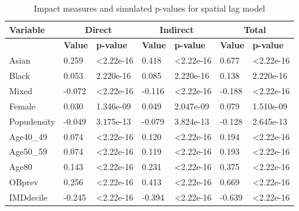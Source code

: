 \begin{table}[]
\centering
\begin{tabular}{|l||l|l||l|l||l|l|}
\hline
\textbf{Variable} & \multicolumn{2}{c||}{\textbf{Direct}} & \multicolumn{2}{c||}{\textbf{Indirect}} & \multicolumn{2}{c|}{\textbf{Total}} \\ \hline
                  & \textbf{Value} & \textbf{p-value} & \textbf{Value} & \textbf{p-value} & \textbf{Value} & \textbf{p-value} \\ \hline
Asian             & 0.259 & \textless 2.22e-16 & 0.418 & \textless 2.22e-16 & 0.677 & \textless 2.22e-16 \\ \hline
Black             & 0.053 & 2.220e-16 & 0.085 & 2.220e-16 & 0.138 & 2.220e-16 \\ \hline
Mixed             & -0.072 & \textless 2.22e-16 & -0.116 & \textless 2.22e-16 & -0.188 & \textless 2.22e-16 \\ \hline
Female            & 0.030 & 1.346e-09 & 0.049 & 2.047e-09 & 0.079 & 1.510e-09 \\ \hline
Popudensity       & -0.049 & 3.175e-13 & -0.079 & 3.824e-13 & -0.128 & 2.645e-13 \\ \hline
Age40\_49         & 0.074 & \textless 2.22e-16 & 0.120 & \textless 2.22e-16 & 0.194 & \textless 2.22e-16 \\ \hline
Age50\_59         & 0.074 & \textless 2.22e-16 & 0.119 & \textless 2.22e-16 & 0.193 & \textless 2.22e-16 \\ \hline
Age80             & 0.143 & \textless 2.22e-16 & 0.231 & \textless 2.22e-16 & 0.375 & \textless 2.22e-16 \\ \hline
OBprev            & 0.256 & \textless 2.22e-16 & 0.413 & \textless 2.22e-16 & 0.669 & \textless 2.22e-16 \\ \hline
IMDdecile         & -0.245 & \textless 2.22e-16 & -0.394 & \textless 2.22e-16 & -0.639 & \textless 2.22e-16 \\ \hline
\end{tabular}
\caption{
Impact measures and simulated p-values for spatial lag model
}
\label{tab: A4.6}
\end{table}


